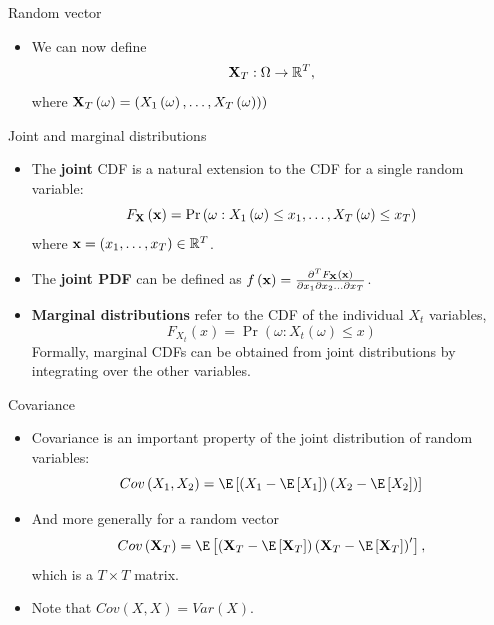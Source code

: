 \documentclass[aspectratio=169,11pt]{beamer}
\begin{document}
\begin{frame}{Random vector}
\begin{itemize}
	\item We can now define\[
	{\bf X}_T: \Omega \rightarrow \mathbb{R}^T,
\]
where ${\bf X}_T\left(\omega\right) = \left(X_1\left(\omega\right),\dots,X_T\left(\omega)\right)\right)$
\end{itemize}
\end{frame}



\begin{frame}{Joint and marginal distributions}
\begin{itemize}
\item The {\bf joint} CDF is a natural extension to the CDF for a single random variable:\[
		F_{{\bf X}} \left({\bf x}\right) = \Pr\left(\omega: X_1\left(\omega\right)\le x_1, \dots , X_T\left(\omega\right)\le x_T\right)
	\]
where ${\bf x} = \left(x_1,\dots,x_T\right)\in \mathbb{R}^T$.

\smallskip
\item The {\bf joint PDF} can be defined as $f\left( {\bf x} \right) = \frac{\partial^T F_{{\bf X}} \left({\bf x}\right)}{\partial x_1 \partial x_2 \dots \partial x_T}$.

\smallskip
\item {\bf Marginal distributions} refer to the CDF of the individual $X_t$ variables,\[
		F_{X_t} \left(x\right) = \Pr\left(\omega: X_t\left(\omega\right)\le x \right)
		\]
	Formally, marginal CDFs can be obtained  from joint distributions by integrating
		over the other variables. 


\end{itemize}
\end{frame}


\begin{frame}{Covariance}
\begin{itemize}
	\item Covariance is an important property of the joint distribution of random variables:\[
		Cov\left(X_1,X_2\right) = \E\left[ \left( X_1 - \E\left[X_1\right]\right) \left( X_2 - \E\left[X_2\right]\right)\right]
	\]

	\item And more generally for a random vector\[
		Cov\left({\bf X}_T\right) =\E\left[ \left( {\bf X}_T - \E\left[{\bf X}_T\right]\right) \left( {\bf X}_T - \E\left[{\bf X}_T\right]\right)'\right],
	\]
	which is a $T\times T$ matrix. 

	\item Note that $Cov\left(X,X\right) = Var\left(X\right)$.
\end{itemize}
\end{frame}
\end{document}
